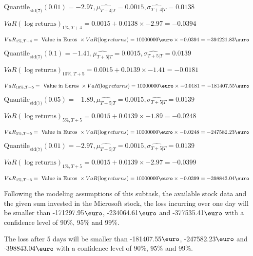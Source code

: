 $\text{Quantile}_\text{std(7)}(0.01) = -2.97,\hat{\mu_{T+4|T}} = 0.0015, \hat{\sigma_{T+4|T}} = 0.0138$

$VaR(\log \text{returns})_{1\%, T + 4} = 0.0015 + 0.0138\times-2.97 = -0.0394$

$VaR_{1\%, T + 4} = \text{ Value in Euros } \times VaR(\log returns) = 10 000 000 \text{\euro} \times-0.0394 = -394221.83 \text{\euro}$


$\text{Quantile}_\text{std(7)}(0.1) = -1.41,\hat{\mu_{T+5|T}} = 0.0015, \hat{\sigma_{T+5|T}} = 0.0139$

$VaR(\log \text{returns})_{10\%, T + 5} = 0.0015 + 0.0139\times-1.41 = -0.0181$

$VaR_{10\%, T + 5} = \text{ Value in Euros } \times VaR(\log returns) = 10 000 000 \text{\euro} \times-0.0181 = -181407.55 \text{\euro}$


$\text{Quantile}_\text{std(7)}(0.05) = -1.89,\hat{\mu_{T+5|T}} = 0.0015, \hat{\sigma_{T+5|T}} = 0.0139$

$VaR(\log \text{returns})_{5\%, T + 5} = 0.0015 + 0.0139\times-1.89 = -0.0248$

$VaR_{5\%, T + 5} = \text{ Value in Euros } \times VaR(\log returns) = 10 000 000 \text{\euro} \times-0.0248 = -247582.23 \text{\euro}$


$\text{Quantile}_\text{std(7)}(0.01) = -2.97,\hat{\mu_{T+5|T}} = 0.0015, \hat{\sigma_{T+5|T}} = 0.0139$

$VaR(\log \text{returns})_{1\%, T + 5} = 0.0015 + 0.0139\times-2.97 = -0.0399$

$VaR_{1\%, T + 5} = \text{ Value in Euros } \times VaR(\log returns) = 10 000 000 \text{\euro} \times-0.0399 = -398843.04 \text{\euro}$


Following the modeling assumptions of this subtask, the available stock data and the given sum invested in the Microsoft stock, the loss incurring over one day will be smaller than -171297.95$\text{\euro}$, -234064.61$\text{\euro}$  and -377535.41$\text{\euro}$  with a confidence level of 90\%, 95\%  and 99\%.

The loss after 5 days will be smaller than -181407.55$\text{\euro}$, -247582.23$\text{\euro}$  and -398843.04$\text{\euro}$  with a confidence level of 90\%, 95\%  and 99\%.

